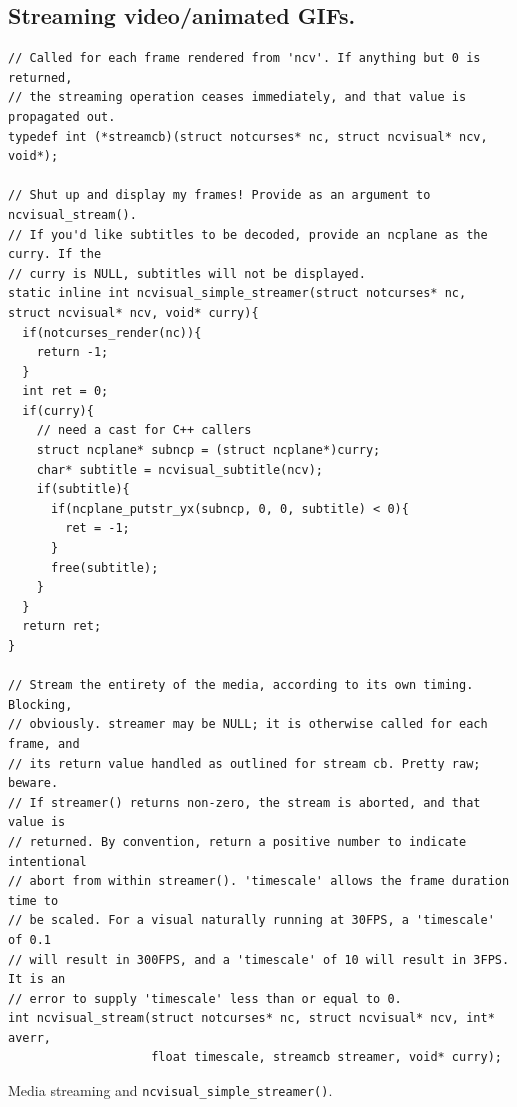 \documentclass[letterpaper,10pt]{article}
\begin{document}
\subsection{Streaming video/animated GIFs.}
\begin{listing}[!htb]
\begin{verbatim}
// Called for each frame rendered from 'ncv'. If anything but 0 is returned,
// the streaming operation ceases immediately, and that value is propagated out.
typedef int (*streamcb)(struct notcurses* nc, struct ncvisual* ncv, void*);

// Shut up and display my frames! Provide as an argument to ncvisual_stream().
// If you'd like subtitles to be decoded, provide an ncplane as the curry. If the
// curry is NULL, subtitles will not be displayed.
static inline int ncvisual_simple_streamer(struct notcurses* nc, struct ncvisual* ncv, void* curry){
  if(notcurses_render(nc)){
    return -1;
  }
  int ret = 0;
  if(curry){
    // need a cast for C++ callers
    struct ncplane* subncp = (struct ncplane*)curry;
    char* subtitle = ncvisual_subtitle(ncv);
    if(subtitle){
      if(ncplane_putstr_yx(subncp, 0, 0, subtitle) < 0){
        ret = -1;
      }
      free(subtitle);
    }
  }
  return ret;
}

// Stream the entirety of the media, according to its own timing. Blocking,
// obviously. streamer may be NULL; it is otherwise called for each frame, and
// its return value handled as outlined for stream cb. Pretty raw; beware.
// If streamer() returns non-zero, the stream is aborted, and that value is
// returned. By convention, return a positive number to indicate intentional
// abort from within streamer(). 'timescale' allows the frame duration time to
// be scaled. For a visual naturally running at 30FPS, a 'timescale' of 0.1
// will result in 300FPS, and a 'timescale' of 10 will result in 3FPS. It is an
// error to supply 'timescale' less than or equal to 0.
int ncvisual_stream(struct notcurses* nc, struct ncvisual* ncv, int* averr,
                    float timescale, streamcb streamer, void* curry);
\end{verbatim}
\caption{Media streaming and \texttt{ncvisual\_simple\_streamer()}.}
\label{list:streaming}
\end{listing}
\end{document}
